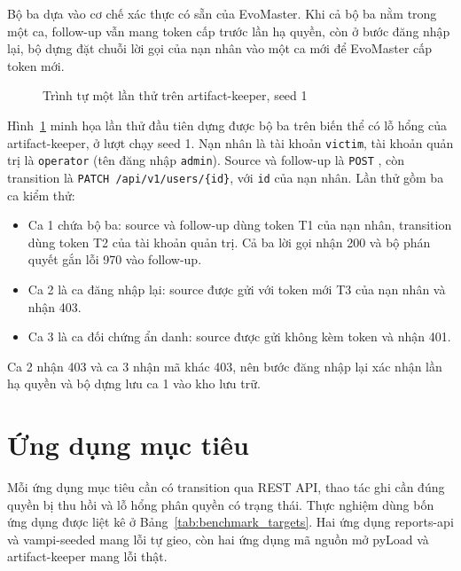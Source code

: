 Bộ ba dựa vào cơ chế xác thực có sẵn của EvoMaster. Khi cả bộ ba nằm trong một ca, follow-up vẫn mang token cấp trước lần hạ quyền, còn ở bước đăng nhập lại, bộ dựng đặt chuỗi lời gọi của nạn nhân vào một ca mới để EvoMaster cấp token mới.

\begin{figure}[htbp]
  \centering
  
  \caption{Trình tự một lần thử trên artifact-keeper, seed 1}
  \label{fig:attempt_sequence}
\end{figure}

Hình~\ref{fig:attempt_sequence} minh họa lần thử đầu tiên dựng được bộ ba trên biến thể có lỗ hổng của artifact-keeper, ở lượt chạy seed 1. Nạn nhân là tài khoản \texttt{victim}, tài khoản quản trị là \texttt{operator} (tên đăng nhập \texttt{admin}). Source và follow-up là \texttt{POST} , còn transition là \texttt{PATCH /api/v1/users/\{id\}}, với \texttt{id} của nạn nhân. Lần thử gồm ba ca kiểm thử:
\begin{itemize}
  \item Ca 1 chứa bộ ba: source và follow-up dùng token T1 của nạn nhân, transition dùng token T2 của tài khoản quản trị. Cả ba lời gọi nhận 200 và bộ phán quyết gắn lỗi 970 vào follow-up.
  \item Ca 2 là ca đăng nhập lại: source được gửi với token mới T3 của nạn nhân và nhận 403.
  \item Ca 3 là ca đối chứng ẩn danh: source được gửi không kèm token và nhận 401.
\end{itemize}
Ca 2 nhận 403 và ca 3 nhận mã khác 403, nên bước đăng nhập lại xác nhận lần hạ quyền và bộ dựng lưu ca 1 vào kho lưu trữ.

\section{Ứng dụng mục tiêu}
\label{sec:impl_benchmarks}

Mỗi ứng dụng mục tiêu cần có transition qua REST API, thao tác ghi cần đúng quyền bị thu hồi và lỗ hổng phân quyền có trạng thái. Thực nghiệm dùng bốn ứng dụng được liệt kê ở Bảng~\ref{tab:benchmark_targets}. Hai ứng dụng reports-api và vampi-seeded mang lỗi tự gieo, còn hai ứng dụng mã nguồn mở pyLoad và artifact-keeper mang lỗi thật.

